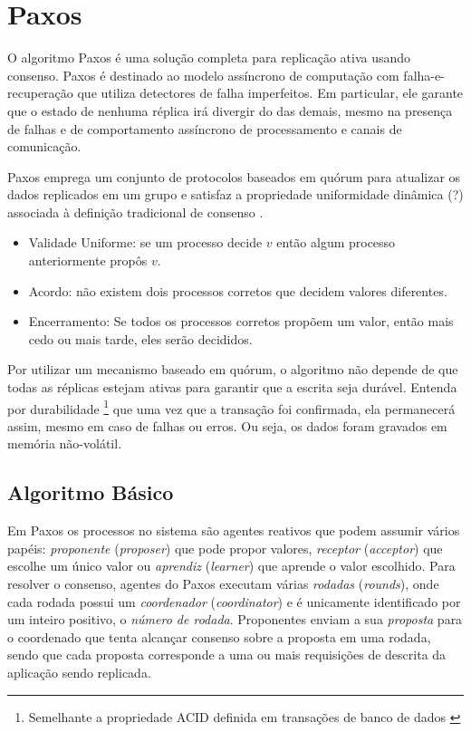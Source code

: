 \section{Paxos}\label{sec:paxos}

O algoritmo Paxos \cite{lamport98} é uma solução completa para replicação ativa usando
consenso. Paxos é destinado ao modelo assíncrono de computação com falha-e-recuperação que
utiliza detectores de falha imperfeitos. Em particular, ele garante que o estado de
nenhuma réplica irá divergir do das demais, mesmo na presença de falhas e de comportamento
assíncrono de processamento e canais de comunicação.

Paxos emprega um conjunto de protocolos baseados em quórum para atualizar os dados
replicados em um grupo e satisfaz a propriedade uniformidade dinâmica (?) associada à
definição tradicional de consenso \cite{cachin11}.

\begin{itemize}
  \item Validade Uniforme: se um processo decide $v$ então algum processo anteriormente
    propôs $v$.
  \item Acordo: não existem dois processos corretos que decidem valores diferentes.
  \item Encerramento: Se todos os processos corretos propõem um valor, então mais cedo ou
    mais tarde, eles serão decididos.
\end{itemize}

Por utilizar um mecanismo baseado em quórum, o algoritmo não depende de que todas as
réplicas estejam ativas para garantir que a escrita seja durável. Entenda por durabilidade
\footnote{Semelhante a propriedade ACID definida em transações de banco de dados
\cite{haerder83}} que uma vez que a transação foi confirmada, ela permanecerá assim, mesmo
em caso de falhas ou erros. Ou seja, os dados foram gravados em memória não-volátil.

\subsection{Algoritmo Básico}

Em Paxos os processos no sistema são agentes reativos que podem assumir vários
papéis: \emph{proponente} (\emph{proposer}) que pode propor valores, \emph{receptor}
(\emph{acceptor}) que escolhe um único valor ou \emph{aprendiz} (\emph{learner}) que
aprende o valor escolhido. Para resolver o consenso, agentes do Paxos executam várias
\emph{rodadas} (\emph{rounds}), onde cada rodada possui um \emph{coordenador}
(\emph{coordinator}) e é unicamente identificado por um inteiro positivo, o \emph{número
de rodada}. Proponentes enviam a sua \emph{proposta} para o coordenado que tenta alcançar
consenso sobre a proposta em uma rodada, sendo que cada proposta corresponde a uma ou mais
requisições de descrita da aplicação sendo replicada.

